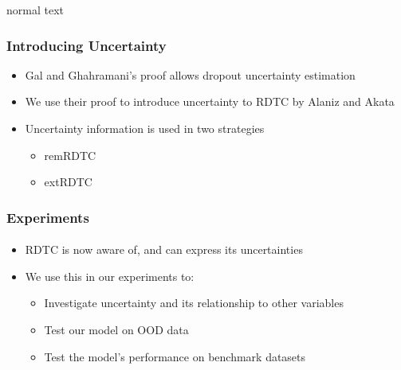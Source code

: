 \documentclass[9pt]{beamer}
\begin{document}
\begin{frame}{normal text}
\frametitle{Introducing Uncertainty}
\begin{itemize}
	\item Gal and Ghahramani's \cite{gal2016dropout} proof allows dropout uncertainty estimation
	\item We use their proof to introduce uncertainty to RDTC by Alaniz and Akata \cite{alaniz2019explainable}
	\item Uncertainty information is used in two strategies
	\begin{itemize}
		\item remRDTC
		\item extRDTC
	\end{itemize}
\end{itemize}
\end{frame}





\begin{frame}
\frametitle{Experiments}
\framesubtitle{}
\begin{itemize}
	\item RDTC is now aware of, and can express its uncertainties
	\item We use this in our experiments to:
	\begin{itemize}
		\item Investigate uncertainty and its relationship to other variables
		\item Test our model on OOD data
		\item Test the model's performance on benchmark datasets
	\end{itemize}
\end{itemize}
\end{frame}
\end{document}
